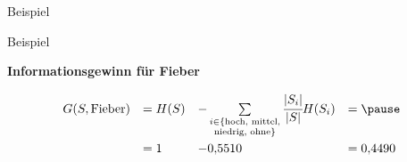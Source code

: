 \begin{frame}{Beispiel}
\end{frame}




\begin{frame}{Beispiel}

\textbf{Informationsgewinn für Fieber}

\[ \displaystyle
\begin{array}{r l l l}
    G(S, \text{Fieber}) &= H(S) &- \sum\limits_{\substack{i \in \{\text{hoch, mittel,} \\ \text{niedrig, ohne}\}}} \cfrac{|S_i|}{|S|}H(S_i) &= \pause \\[2em]
    &= 1 &-0{,}5510 &= 0{,}4490 
\end{array}
\]

\end{frame}



